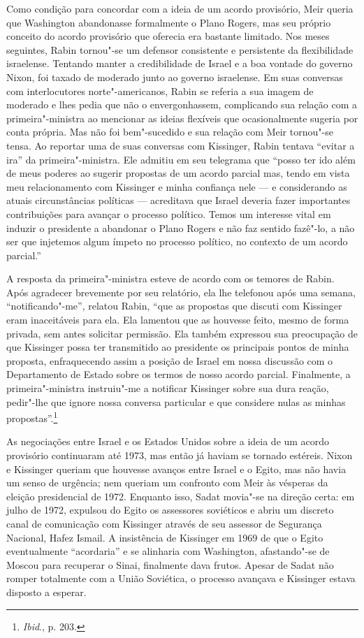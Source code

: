 Como condição para concordar com a ideia de um acordo provisório, Meir
queria que Washington abandonasse formalmente o Plano Rogers, mas seu
próprio conceito do acordo provisório que oferecia era bastante
limitado. Nos meses seguintes, Rabin tornou"-se um defensor consistente e
persistente da flexibilidade israelense. Tentando manter a credibilidade
de Israel e a boa vontade do governo Nixon, foi taxado de moderado
junto ao governo israelense. Em suas conversas com interlocutores
norte"-americanos, Rabin se referia a sua imagem de moderado e lhes pedia
que não o envergonhassem, complicando sua relação com a primeira"-ministra
ao mencionar as ideias flexíveis que ocasionalmente sugeria
por conta própria. Mas não foi bem"-sucedido e sua relação com Meir
tornou"-se tensa. Ao reportar uma de suas conversas com Kissinger, Rabin
tentava ``evitar a ira'' da primeira"-ministra. Ele admitiu em seu
telegrama que ``posso ter ido além de meus poderes ao sugerir propostas
de um acordo parcial mas, tendo em vista meu relacionamento com
Kissinger e minha confiança nele --- e considerando as atuais
circunstâncias políticas --- acreditava que Israel deveria fazer
importantes contribuições para avançar o processo político. Temos um
interesse vital em induzir o presidente a abandonar o Plano Rogers e não
faz sentido fazê"-lo, a não ser que injetemos algum ímpeto no processo
político, no contexto de um acordo parcial.''

A resposta da primeira"-ministra esteve de acordo com os temores de
Rabin. Após agradecer brevemente por seu relatório, ela lhe telefonou após
uma semana, ``notificando"-me'', relatou Rabin, ``que as propostas que
discuti com Kissinger eram inaceitáveis para ela. Ela lamentou que as
houvesse feito, mesmo de forma privada, sem antes solicitar permissão.
Ela também expressou sua preocupação de que Kissinger possa ter
transmitido ao presidente os principais pontos de minha proposta,
enfraquecendo assim a posição de Israel em nossa discussão com o
Departamento de Estado sobre os termos de nosso acordo parcial.
Finalmente, a primeira"-ministra instruiu"-me a notificar Kissinger sobre
sua dura reação, pedir"-lhe que ignore nossa conversa particular e que
considere nulas as minhas propostas''.\footnote{\emph{Ibid}., p. 203.}

As negociações entre Israel e os Estados Unidos sobre a ideia de um
acordo provisório continuaram até 1973, mas então já haviam se tornado
estéreis. Nixon e Kissinger queriam que houvesse avanços entre Israel e
o Egito, mas não havia um senso de urgência; nem queriam um confronto
com Meir às vésperas da eleição presidencial de 1972. Enquanto isso,
Sadat movia"-se na direção certa: em julho de 1972, expulsou do Egito os
assessores soviéticos e abriu um discreto canal de comunicação com
Kissinger através de seu assessor de Segurança Nacional, Hafez Ismail. A
insistência de Kissinger em 1969 de que o Egito eventualmente
``acordaria'' e se alinharia com Washington, afastando"-se de Moscou para
recuperar o Sinai, finalmente dava frutos. Apesar de Sadat não romper
totalmente com a União Soviética, o processo avançava e Kissinger estava
disposto a esperar.

